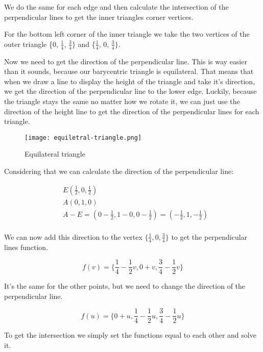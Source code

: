 \documentclass[12pt]{report} \usepackage{preamble}
\begin{document}
We do the same for each edge and then calculate the intersection of the
perpendicular lines to get the inner triangles corner vertices.

For the bottom left corner of the inner triangle we take the
two vertices of the outer triangle \{0, \(\frac{1}{4}\), \(\frac{3}{4}\}\)
and \{\(\frac{1}{4}\), 0, \(\frac{3}{4}\}\).

Now we need to get the direction of the perpendicular line.
This is way easier than it sounds, because our barycentric triangle is equilateral.
That means that when we draw a line to display the height of the triangle and take it's direction,
we get the direction of the perpendicular line to the lower edge.
Luckily, because the triangle stays the same no matter how we rotate it, we can just use
the direction of the height line to get the direction of the
perpendicular lines for each triangle. \cite{equilateral-triangle}

\begin{figure}[htbp]
	\centering \texttt{[image: equiletral-triangle.png]}
	\caption{Equilateral triangle}
	\cite{equilateral-triangle}
\end{figure} \Floatbarrier

Considering that we can calculate the direction of the perpendicular line:

\[
	\begin{aligned}
		 & E(\frac{1}{2}, 0, \frac{1}{2})                                                      \\
		 & A(0, 1, 0)                                                                          \\
		 & A - E = (0 - \frac{1}{2}, 1 - 0, 0 - \frac{1}{2}) = (-\frac{1}{2}, 1, -\frac{1}{2}) \\
	\end{aligned}
\]

We can now add this direction to the vertex \(\{\frac{1}{4}, 0, \frac{3}{4}\}\)
to get the perpendicular lines function.

\[
	f(v) = \{\frac{1}{4} - \frac{1}{2}v, 0 + v, \frac{3}{4} - \frac{1}{2}v\}
\]

It's the same for the other points, but we need to change the direction of the perpendicular line.

\[
	f(u) = \{0+u, \frac{1}{4} - \frac{1}{2}u, \frac{3}{4} - \frac{1}{2}u\}
\]

To get the intersection we simply set the functions equal to each other and solve it.
\end{document}

